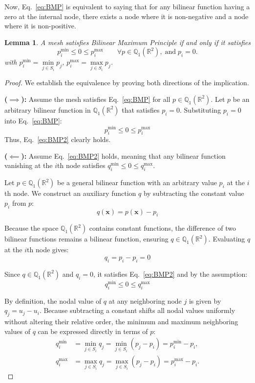 \documentclass[a4paper]{article}
\theoremstyle{plain}
\newtheorem{lemma}{Lemma}
\theoremstyle{definition}
\theoremstyle{remark}
\begin{document}
Now, Eq.~\eqref{eq:BMP} is equivalent to saying that for any bilinear function having a zero at the internal node, there exists a node where it is non-negative and a node where it is non-positive.

\begin{lemma}
A mesh satisfies Bilinear Maximum Principle if and only if it satisfies
\begin{equation}
p_i^{\min} \leq 0 \leq p_i^{\max} \qquad \forall p \in \mathbb{Q}_1(\mathbb{R}^2),\; \text{and} \; p_i =0.   \label{eq:BMP2}
\end{equation}
with $p_i^{\min} = \min\limits_{j \in S_i} p_j$, $p_i^{\max}=\max\limits_{j \in S_i} p_j$.\label{lem:BMP2}
\end{lemma}

\begin{proof}
We establish the equivalence by proving both directions of the implication.
	
\textbf{($\implies$):} 
Assume the mesh satisfies Eq.~\eqref{eq:BMP} for all $p \in \mathbb{Q}_1(\mathbb{R}^2)$. Let $p$ be an arbitrary bilinear function in $\mathbb{Q}_1(\mathbb{R}^2)$ that  satisfies $p_i = 0$. Substituting $p_i = 0$ into Eq.~\eqref{eq:BMP}:
$$
p_i^{\min} \leq 0 \leq p_i^{\max}
$$
Thus, Eq.~\eqref{eq:BMP2} clearly holds.
	
\textbf{($\impliedby$):} 
Assume Eq.~\eqref{eq:BMP2} holds, meaning that any bilinear function vanishing at the $i$th node satisfies $q_i^{\min} \leq 0 \leq q_i^{\max}$. 
	
Let $p \in \mathbb{Q}_1(\mathbb{R}^2)$ be a general bilinear function with an arbitrary value $p_i$ at the $i$th node. We construct an auxiliary function $q$ by subtracting the constant value $p_i$ from $p$:
$$
q(\mathbf{x}) = p(\mathbf{x}) - p_i
$$
	
Because the space $\mathbb{Q}_1(\mathbb{R}^2)$ contains constant functions, the difference of two bilinear functions remains a bilinear function, ensuring $q \in \mathbb{Q}_1(\mathbb{R}^2)$. Evaluating $q$ at the $i$th node gives:
$$
q_i = p_i - p_i = 0
$$
	
Since $q \in \mathbb{Q}_1(\mathbb{R}^2)$ and $q_i = 0$, it satisfies Eq.~\eqref{eq:BMP2} and by the assumption:
\begin{equation}
q_i^{\min} \leq 0 \leq q_i^{\max} \label{eq:q_ineq}
\end{equation}

By definition, the nodal value of $q$ at any neighboring node $j$ is given by $q_j = u_j - u_i$. Because subtracting a constant shifts all nodal values uniformly without altering their relative order, the minimum and maximum neighboring values of $q$ can be expressed directly in terms of $p$:
\begin{align*}
q_i^{\min} &= \min_{j \in S_i} q_j = \min_{j \in S_i} (p_j - p_i) = p_i^{\min} - p_i, \\
q_i^{\max} &= \max_{j \in S_i} q_j = \max_{j \in S_i} (p_j - p_i) = p_i^{\max} - p_i.
\end{align*}


\end{proof}
\end{document}
